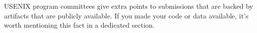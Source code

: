 USENIX program committees give extra points to submissions that are
backed by artifacts that are publicly available. If you made your code
or data available, it's worth mentioning this fact in a dedicated
section.







